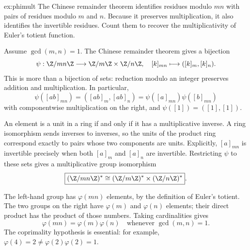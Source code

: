 \begin{solution}{ex:phimult}
\idea The Chinese remainder theorem identifies residues modulo $mn$ with pairs of residues modulo $m$ and $n$. Because it preserves multiplication, it also identifies the invertible residues. Count them to recover the multiplicativity of Euler's totient function.

\writeup Assume $\gcd(m,n)=1$. The Chinese remainder theorem gives a bijection
\[
\psi:\Z/mn\Z\longrightarrow\Z/m\Z\times\Z/n\Z,\quad
[k]_{mn}\longmapsto([k]_m,[k]_n).
\]
This is more than a bijection of sets: reduction modulo an integer preserves addition and multiplication. In particular,
\[
\psi([ab]_{mn})=([ab]_m,[ab]_n)
=\psi([a]_{mn})\psi([b]_{mn})
\]
with componentwise multiplication on the right, and $\psi([1])=([1],[1])$.

An element is a unit in a ring if and only if it has a multiplicative inverse. A ring isomorphism sends inverses to inverses, so the units of the product ring correspond exactly to pairs whose two components are units. Explicitly, $[a]_{mn}$ is invertible precisely when both $[a]_m$ and $[a]_n$ are invertible. Restricting $\psi$ to these sets gives a multiplicative group isomorphism
\[
\boxed{(\Z/mn\Z)^*
\cong(\Z/m\Z)^*\times(\Z/n\Z)^*}.
\]

The left-hand group has $\varphi(mn)$ elements, by the definition of Euler's totient. The two groups on the right have $\varphi(m)$ and $\varphi(n)$ elements; their direct product has the product of those numbers. Taking cardinalities gives
\[
\boxed{\varphi(mn)=\varphi(m)\varphi(n)}
\quad\text{whenever }\gcd(m,n)=1.
\]
The coprimality hypothesis is essential: for example, $\varphi(4)=2\ne\varphi(2)\varphi(2)=1$.
\end{solution}

